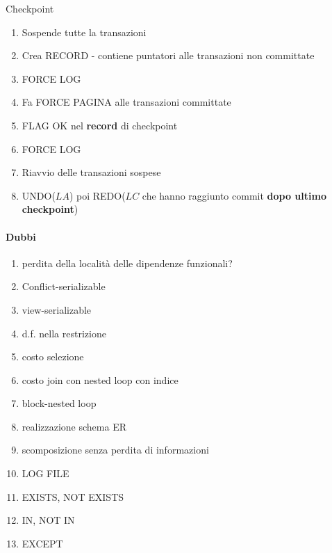\documentclass{exam}
\begin{document}
\begin{questions}
\begin{solution}
    \end{solution}
    \question Checkpoint
    \begin{solution}
        \begin{enumerate}
            \item Sospende tutte la transazioni
            \item Crea RECORD - contiene puntatori alle transazioni non committate
            \item FORCE LOG 
            \item Fa FORCE PAGINA alle transazioni committate
            \item FLAG OK nel \textbf{record} di checkpoint
            \item FORCE LOG 
            \item Riavvio delle transazioni sospese
            \item UNDO($LA$) poi REDO($LC$ che hanno raggiunto commit \textbf{dopo ultimo checkpoint}) 
        \end{enumerate}
    \end{solution}
\end{questions}



\paragraph{Dubbi}
\begin{enumerate}
    \item perdita della località delle dipendenze funzionali?
    \item Conflict-serializable
    \item view-serializable
    \item d.f. nella restrizione
    \item costo selezione
    \item costo join con nested loop con indice
    \item block-nested loop
    \item realizzazione schema ER
    \item scomposizione senza perdita di informazioni
    \item LOG FILE
    \item EXISTS, NOT EXISTS
    \item IN, NOT IN
    \item EXCEPT
\end{enumerate}
\end{document}
